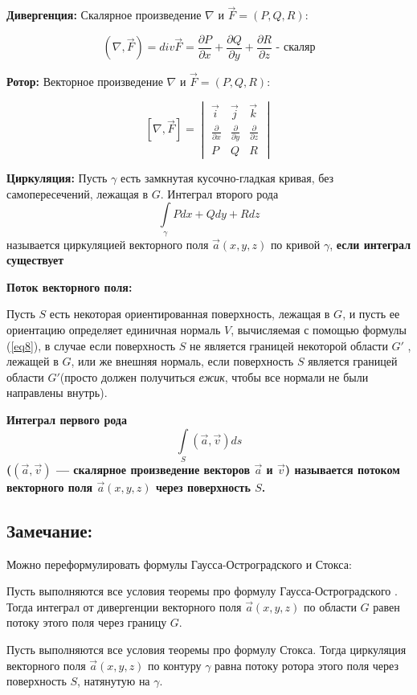 \documentclass[12pt, english]{article}
\begin{document}
\textbf{Дивергенция:}
	Скалярное произведение $\nabla $ и  $\vec{F}= (P , Q , R)$:
	
	$$(\nabla , \vec{F}) = div \vec{F} = \frac{\partial P}{\partial x} + \frac{\partial Q}{\partial y} + \frac{\partial R}{\partial z} \text{ - скаляр}$$ 

\textbf{Ротор:}
	Векторное произведение $\nabla $ и  $\vec{F}= (P , Q , R)$:

$$
[\nabla ,\vec{F}] = 
\begin{vmatrix}
\vec{i} & \vec{j} & \vec{k} \\
\frac{\partial}{\partial x} & \frac{\partial}{\partial y}& \frac{\partial}{\partial z} \\
P & Q & R
\end{vmatrix}
$$

\textbf{Циркуляция:}
	Пусть $\gamma$ есть замкнутая кусочно-гладкая кривая, без самопересечений,
лежащая в $G$. Интеграл второго рода 
	$$\int\limits_{\gamma} P dx + Q dy + R dz$$
называется циркуляцией векторного поля $\vec{a}(x, y, z)$ по кривой $\gamma$, \textbf{если интеграл существует}

\textbf{Поток векторного поля:}

	Пусть $S$ есть некоторая ориентированная поверхность, лежащая в $G$,
и пусть ее ориентацию определяет единичная нормаль 
$V$, вычисляемая с помощью формулы (\ref{eq8}), в случае если поверхность $S$ не является границей некоторой области $G'$
, лежащей в $G$, или же внешняя нормаль, если
поверхность $S$ является границей области $G'$(просто должен получиться \textit{ежик}, чтобы все нормали не были направлены внутрь).
 
\textbf{Интеграл первого рода}
	$$\int\limits_{S} (\vec{a} , \vec{v})ds$$
\textbf{($(\vec{a} , \vec{v})$ — скалярное произведение векторов $\vec{a}$ и $\vec{v}$) называется потоком векторного поля $\vec{a}(x, y, z)$ через поверхность $S$.}

\subsection{Замечание:}
	Можно переформулировать формулы Гаусса-Остроградского и Стокса:
	
	Пусть выполняются все условия теоремы про формулу Гаусса-Остроградского . Тогда интеграл от дивергенции векторного поля $\vec{a}(x, y, z)$ по области $G$ равен потоку этого поля через границу $G$.


	Пусть выполняются все условия теоремы про формулу Стокса. Тогда циркуляция векторного поля $\vec{a}(x, y, z)$ по контуру $\gamma$ равна потоку ротора этого поля через поверхность $S$, натянутую на $\gamma$.
	
\end{document}
